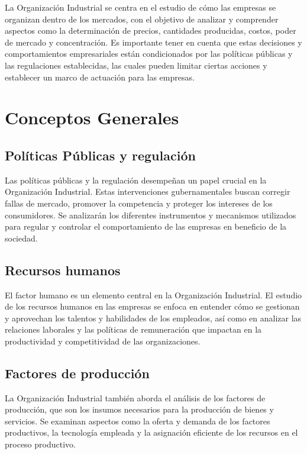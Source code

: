 \documentclass[
  doc,
  floatsintext,
  longtable,
  a4paper,
  nolmodern,
  notxfonts,
  notimes,
  colorlinks=true,linkcolor=blue,citecolor=blue,urlcolor=blue]{apa7}
\begin{document}
La Organización Industrial se centra en el estudio de cómo las empresas
se organizan dentro de los mercados, con el objetivo de analizar y
comprender aspectos como la determinación de precios, cantidades
producidas, costos, poder de mercado y concentración. Es importante
tener en cuenta que estas decisiones y comportamientos empresariales
están condicionados por las políticas públicas y las regulaciones
establecidas, las cuales pueden limitar ciertas acciones y establecer un
marco de actuación para las empresas.

\section{Conceptos Generales}\label{conceptos-generales}

\subsection{Políticas Públicas y
regulación}\label{poluxedticas-puxfablicas-y-regulaciuxf3n}

Las políticas públicas y la regulación desempeñan un papel crucial en la
Organización Industrial. Estas intervenciones gubernamentales buscan
corregir fallas de mercado, promover la competencia y proteger los
intereses de los consumidores. Se analizarán los diferentes instrumentos
y mecanismos utilizados para regular y controlar el comportamiento de
las empresas en beneficio de la sociedad.

\subsection{Recursos humanos}\label{recursos-humanos}

El factor humano es un elemento central en la Organización Industrial.
El estudio de los recursos humanos en las empresas se enfoca en entender
cómo se gestionan y aprovechan los talentos y habilidades de los
empleados, así como en analizar las relaciones laborales y las políticas
de remuneración que impactan en la productividad y competitividad de las
organizaciones.

\subsection{Factores de producción}\label{factores-de-producciuxf3n}

La Organización Industrial también aborda el análisis de los factores de
producción, que son los insumos necesarios para la producción de bienes
y servicios. Se examinan aspectos como la oferta y demanda de los
factores productivos, la tecnología empleada y la asignación eficiente
de los recursos en el proceso productivo.
\end{document}
